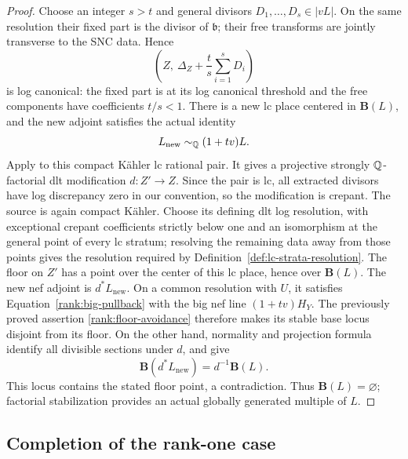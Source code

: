 \begin{proof}
Choose an integer \(s>t\) and general divisors
\(D_1,\ldots,D_s\in|vL|\).  On the same resolution their fixed
part is the divisor of \(\mathfrak b\); their free transforms
are jointly transverse to the SNC data.  Hence
\[
 \left(Z,\ \Delta_Z+\frac{t}{s}\sum_{i=1}^s D_i\right)
\]
is log canonical: the fixed part is at its log canonical
threshold and the free components have coefficients \(t/s<1\).
There is a new lc place centered in \(\mathbf B(L)\), and the
new adjoint satisfies the actual identity
\[
             L_{\mathrm{new}}\sim_{\mathbb Q}(1+tv)L.
\]
Apply \cite[Theorem~3.3]{HLX} to this compact Kähler lc rational
pair.  It gives a projective strongly \(\mathbb Q\)-factorial dlt
modification \(d:Z'\to Z\).  Since the pair is lc, all extracted
divisors have log discrepancy zero in our convention, so the
modification is crepant.  The source is again compact Kähler.
Choose its defining dlt log resolution, with exceptional crepant
coefficients strictly below one and an isomorphism at the general
point of every lc stratum; resolving the remaining data away from
those points gives the resolution required by
Definition~\ref{def:lc-strata-resolution}.  The floor on \(Z'\) has a point over the center
of this lc place, hence over \(\mathbf B(L)\).
The new nef adjoint is \(d^*L_{\mathrm{new}}\).  On a common
resolution with \(U\), it satisfies
Equation~\eqref{rank:big-pullback} with the big nef line
\((1+tv)H_Y\).  The previously proved assertion
\eqref{rank:floor-avoidance} therefore makes its stable base locus
disjoint from its floor.  On the
other hand, normality and projection formula identify all
divisible sections under \(d\), and give
\[
       \mathbf B(d^*L_{\mathrm{new}})
                        =d^{-1}\mathbf B(L).
\]
This locus contains the stated floor point, a contradiction.
Thus \(\mathbf B(L)=\varnothing\); factorial stabilization
provides an actual globally generated multiple of \(L\).
\end{proof}

\subsection{Completion of the rank-one case}

